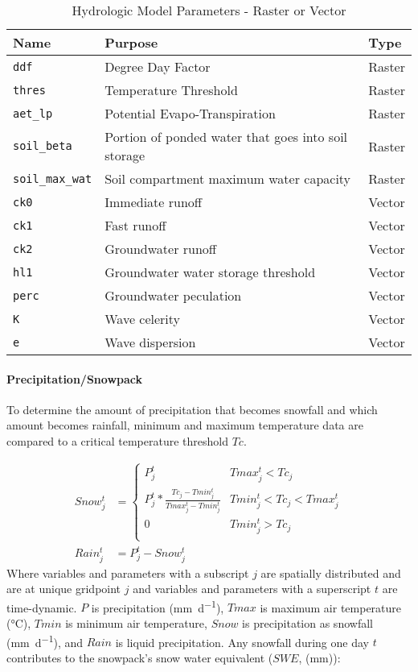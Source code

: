 \begin{table}[]
\caption{Hydrologic Model Parameters - Raster or Vector} 
\begin{tabular}{lll}
Name & Purpose & Type \\ \hline
\texttt{ddf}                  & Degree Day Factor & Raster \\
\texttt{thres}        & Temperature Threshold & Raster \\
\texttt{aet\_lp}              & Potential Evapo-Transpiration & Raster \\
\texttt{soil\_beta}          & Portion of ponded water that goes into soil storage & Raster \\
\texttt{soil\_max\_wat}       & Soil compartment maximum water capacity & Raster \\
\texttt{ck0}       & Immediate runoff & Vector \\
\texttt{ck1}      & Fast runoff & Vector \\
\texttt{ck2}       & Groundwater runoff & Vector \\
\texttt{hl1}       & Groundwater water storage threshold & Vector \\
\texttt{perc}       & Groundwater peculation & Vector \\
\texttt{K}        & Wave celerity & Vector \\
\texttt{e}       & Wave dispersion & Vector \\
\end{tabular}
\label{tab:t_grid_cm}
\end{table}

\paragraph{Precipitation/Snowpack}

To determine the amount of precipitation that becomes snowfall and which amount becomes rainfall, minimum and maximum temperature data are compared to a critical temperature threshold $Tc$.

\begin{align}
Snow_j^t &= \left\{
        \begin{array}{ll}
        P_j^t &  Tmax_j^t < Tc_j \\  
        P_j^t * \frac{Tc_j - Tmin_j^t}{Tmax_j^t - Tmin_j^t} & Tmin_j^t < Tc_j < Tmax_j^t \\
        0 &  Tmin_j^t > Tc_j \\
        \end{array}
\right.\\
Rain_j^t &= P_j^t - Snow_j^t     
\end{align}
\noindent Where variables and parameters with a subscript $j$ are spatially distributed and are at unique gridpoint $j$ and variables and parameters with a superscript $t$ are time-dynamic. $P$ is precipitation (\si{\milli\metre\per\day}), $Tmax$ is maximum air temperature (\si{\degreeCelsius}), $Tmin$ is minimum air temperature, $Snow$ is precipitation as snowfall (\si{\milli\metre\per\day}), and $Rain$ is liquid precipitation. Any snowfall during one day $t$ contributes to the snowpack's snow water equivalent ($SWE$, (\si{\milli\metre})):

